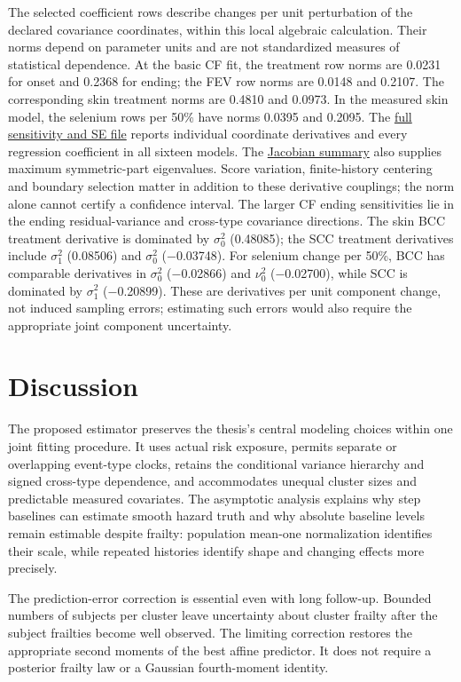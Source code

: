 \documentclass[11pt]{article}
\begin{document}
The selected coefficient rows describe changes per unit perturbation of the declared covariance coordinates, within this local algebraic calculation. Their norms depend on parameter units and are not standardized measures of statistical dependence. At the basic CF fit, the treatment row norms are 0.0231 for onset and 0.2368 for ending; the FEV row norms are 0.0148 and 0.2107. The corresponding skin treatment norms are 0.4810 and 0.0973. In the measured skin model, the selenium rows per 50\% have norms 0.0395 and 0.2095. The \href{../results/manuscript_v010/clinical_regression.csv}{full sensitivity and SE file} reports individual coordinate derivatives and every regression coefficient in all sixteen models. The \href{../results/manuscript_v010/clinical_jacobians.csv}{Jacobian summary} also supplies maximum symmetric-part eigenvalues. Score variation, finite-history centering and boundary selection matter in addition to these derivative couplings; the norm alone cannot certify a confidence interval. The larger CF ending sensitivities lie in the ending residual-variance and cross-type covariance directions. The skin BCC treatment derivative is dominated by \(\sigma_0^2\) (0.48085); the SCC treatment derivatives include \(\sigma_1^2\) (0.08506) and \(\sigma_0^2\) ($-$0.03748). For selenium change per 50\%, BCC has comparable derivatives in \(\sigma_0^2\) ($-$0.02866) and \(\nu_0^2\) ($-$0.02700), while SCC is dominated by \(\sigma_1^2\) ($-$0.20899). These are derivatives per unit component change, not induced sampling errors; estimating such errors would also require the appropriate joint component uncertainty.

\section{Discussion}\label{sec:8}

The proposed estimator preserves the thesis's central modeling choices within one joint fitting procedure. It uses actual risk exposure, permits separate or overlapping event-type clocks, retains the conditional variance hierarchy and signed cross-type dependence, and accommodates unequal cluster sizes and predictable measured covariates. The asymptotic analysis explains why step baselines can estimate smooth hazard truth and why absolute baseline levels remain estimable despite frailty: population mean-one normalization identifies their scale, while repeated histories identify shape and changing effects more precisely.

The prediction-error correction is essential even with long follow-up. Bounded numbers of subjects per cluster leave uncertainty about cluster frailty after the subject frailties become well observed. The limiting correction restores the appropriate second moments of the best affine predictor. It does not require a posterior frailty law or a Gaussian fourth-moment identity.
\end{document}
